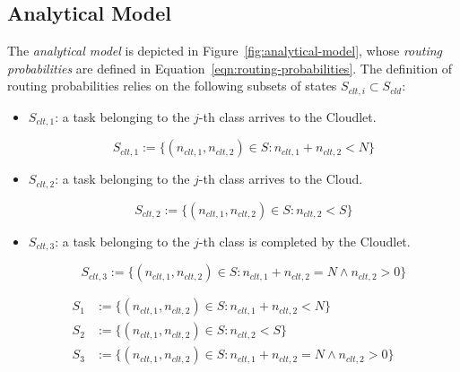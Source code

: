 \subsection{Analytical Model}
The \textit{analytical model} is depicted in Figure~\ref{fig:analytical-model}, whose \textit{routing probabilities} are defined in Equation~\ref{eqn:routing-probabilities}.
The definition of routing probabilities relies on the following subsets of states $S_{clt,i} \subset S_{cld}$:

\begin{itemize}
	\item $S_{clt,1}$:  a task belonging to the $j$-th class arrives to the Cloudlet.
	
	\begin{equation}
	S_{clt,1} := \{(n_{clt,1},n_{clt,2})\in S : n_{clt,1}+n_{clt,2}<N\}
	\end{equation}
	
	\item $S_{clt,2}$: a task belonging to the $j$-th class arrives to the Cloud.
	
	\begin{equation}
	S_{clt,2} := \{(n_{clt,1},n_{clt,2})\in S : n_{clt,2}<S\}
	\end{equation}
	
	\item $S_{clt,3}$: a task belonging to the $j$-th class is completed by the Cloudlet.
	
	\begin{equation}
	S_{clt,3} := \{(n_{clt,1},n_{clt,2})\in S : n_{clt,1}+n_{clt,2}=N \wedge n_{clt,2}>0\}
	\end{equation}
\end{itemize}

\begin{equation} 
\begin{split}
S_{1} & := \{(n_{clt,1},n_{clt,2})\in S : n_{clt,1}+n_{clt,2}<N\} \\
S_{2} & := \{(n_{clt,1},n_{clt,2})\in S : n_{clt,2}<S\}\\
S_{3} & := \{(n_{clt,1},n_{clt,2})\in S : n_{clt,1}+n_{clt,2}=N \wedge n_{clt,2}>0\}\\
\end{split}
\label{eqn:routing-probabilities-states}
\end{equation}

